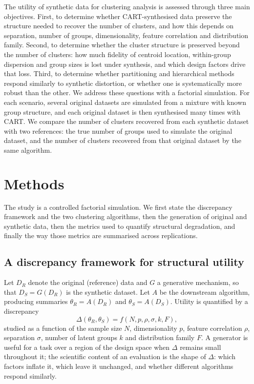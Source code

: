 \documentclass[pdflatex,sn-basic]{sn-jnl}
\begin{document}
The utility of synthetic data for clustering analysis is assessed through three
main objectives. First, to determine whether CART-synthesised data preserve the
structure needed to recover the number of clusters, and how this depends on
separation, number of groups, dimensionality, feature correlation and
distribution family. Second, to determine whether the cluster structure is
preserved beyond the number of clusters: how much fidelity of centroid
location, within-group dispersion and group sizes is lost under synthesis, and
which design factors drive that loss. Third, to determine whether partitioning
and hierarchical methods respond similarly to synthetic distortion, or whether
one is systematically more robust than the other. We address these questions
with a factorial simulation. For each scenario, several original datasets are
simulated from a mixture with known group structure, and each original dataset
is then synthesised many times with CART. We compare the number of clusters
recovered from each synthetic dataset with two references: the true number of
groups used to simulate the original dataset, and the number of clusters
recovered from that original dataset by the same algorithm.

\section{Methods}

The study is a controlled factorial simulation. We first state the discrepancy
framework and the two clustering algorithms, then the generation of original
and synthetic data, then the metrics used to quantify structural degradation,
and finally the way those metrics are summarised across replications.

\subsection{A discrepancy framework for structural utility}

Let $D_R$ denote the original (reference) data and $G$ a generative mechanism,
so that $D_S = G(D_R)$ is the synthetic dataset. Let $A$ be the downstream
algorithm, producing summaries $\theta_R = A(D_R)$ and $\theta_S = A(D_S)$.
Utility is quantified by a discrepancy
\begin{equation}
  \Delta(\theta_R, \theta_S) = f(N, p, \rho, \sigma, k, F),
  \label{eq:discrepancy}
\end{equation}
studied as a function of the sample size $N$, dimensionality $p$, feature
correlation $\rho$, separation $\sigma$, number of latent groups $k$ and
distribution family $F$. A generator is useful for a task over a region of the
design space when $\Delta$ remains small throughout it; the scientific content
of an evaluation is the shape of $\Delta$: which factors inflate it, which leave
it unchanged, and whether different algorithms respond similarly.
\end{document}
